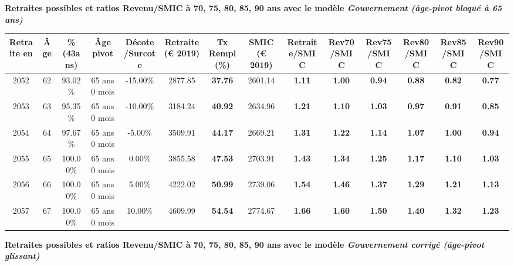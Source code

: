{\bf \noindent Retraites possibles et ratios Revenu/SMIC à 70, 75, 80, 85, 90 ans avec le modèle \emph{Gouvernement (âge-pivot bloqué à 65 ans)}}  
 
\begin{adjustbox}{max width=\textwidth} 
\begin{tabular}[htb]{|c|c||c|c|c||c|c||c||c|c|c|c|c|c|} 
\hline 
 Retraite en &  Âge &  \%(43ans) &  Âge pivot &  Décote/Surcote &  Retraite (\euro{} 2019) &  Tx Rempl(\%) &  SMIC (\euro{} 2019) &  Retraite/SMIC &  Rev70/SMIC &  Rev75/SMIC &  Rev80/SMIC &  Rev85/SMIC &  Rev90/SMIC \\ 
\hline \hline 
 2052 &  62 &  93.02\% &  65 ans 0 mois &  -15.00\% &  2877.85 &  {\bf 37.76} &  2601.14 &  {\bf 1.11} &  {\bf {\color{red} 1.00}} &  {\bf {\color{red} 0.94}} &  {\bf {\color{red} 0.88}} &  {\bf {\color{red} 0.82}} &  {\bf {\color{red} 0.77}} \\ 
\hline 
 2053 &  63 &  95.35\% &  65 ans 0 mois &  -10.00\% &  3184.24 &  {\bf 40.92} &  2634.96 &  {\bf 1.21} &  {\bf 1.10} &  {\bf 1.03} &  {\bf {\color{red} 0.97}} &  {\bf {\color{red} 0.91}} &  {\bf {\color{red} 0.85}} \\ 
\hline 
 2054 &  64 &  97.67\% &  65 ans 0 mois &  -5.00\% &  3509.91 &  {\bf 44.17} &  2669.21 &  {\bf 1.31} &  {\bf 1.22} &  {\bf 1.14} &  {\bf 1.07} &  {\bf 1.00} &  {\bf {\color{red} 0.94}} \\ 
\hline 
 2055 &  65 &  100.00\% &  65 ans 0 mois &  0.00\% &  3855.58 &  {\bf 47.53} &  2703.91 &  {\bf 1.43} &  {\bf 1.34} &  {\bf 1.25} &  {\bf 1.17} &  {\bf 1.10} &  {\bf 1.03} \\ 
\hline 
 2056 &  66 &  100.00\% &  65 ans 0 mois &  5.00\% &  4222.02 &  {\bf 50.99} &  2739.06 &  {\bf 1.54} &  {\bf 1.46} &  {\bf 1.37} &  {\bf 1.29} &  {\bf 1.21} &  {\bf 1.13} \\ 
\hline 
 2057 &  67 &  100.00\% &  65 ans 0 mois &  10.00\% &  4609.99 &  {\bf 54.54} &  2774.67 &  {\bf 1.66} &  {\bf 1.60} &  {\bf 1.50} &  {\bf 1.40} &  {\bf 1.32} &  {\bf 1.23} \\ 
\hline 
\hline 
\end{tabular} 
\end{adjustbox} 
 
 \vspace{0.1cm} 
{\bf \noindent Retraites possibles et ratios Revenu/SMIC à 70, 75, 80, 85, 90 ans avec le modèle \emph{Gouvernement corrigé (âge-pivot glissant)}}  
 
